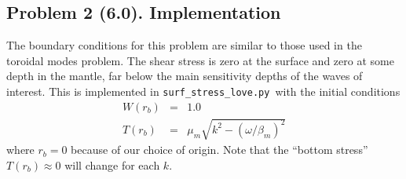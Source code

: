 \documentclass[11pt,titlepage,fleqn]{article}
\newcommand{\tfilessB}{{\tt surf\_stress\_love.py}}
\begin{document}

\subsection*{Problem 2 (6.0). Implementation}

The boundary conditions for this problem are similar to those used in the toroidal modes problem. The shear stress is zero at the surface and zero at some depth in the mantle, far below the main sensitivity depths of the waves of interest. This is implemented in \tfilessB\ with the initial conditions
%
\begin{eqnarray}
W(r_b) &=& 1.0
\label{Wbase}
\\
T(r_b) &=& \mu_m \sqrt{k^2 - (\omega/\beta_m)^2}
\label{Tbase}
\end{eqnarray}
%
where $r_b = 0$ because of our choice of origin. Note that the ``bottom stress'' $T(r_b) \approx 0$ will change for each $k$.
%
%

\end{document}
